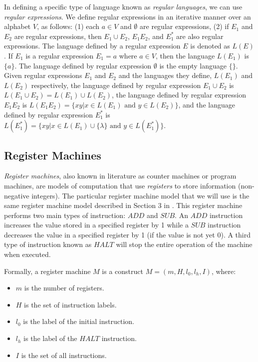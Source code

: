 \documentclass[runningheads,a4paper]{llncs}
\begin{document}
In defining a specific type of language known as \textit{regular languages}, we can use
\textit{regular expressions}. We define regular expressions in an iterative manner over an alphabet
$V$, as follows: (1) each $a \in V$ and $\emptyset$ are regular expressions, (2) if $E_1$ and $E_2$ are regular expressions, then $E_1 \cup E_2$,
$E_1 E_2$, and $E_1^*$ are also regular expressions. The language defined by a regular expression $E$ is denoted as $L(E)$. If $E_1$ is a regular
expression $E_1 = a$ where  $a \in V$, then the language $L(E_1)$ is $\{a\}$. The language defined by regular expression $\emptyset$ is the empty
language $\{\}$. Given regular expressions $E_1$ and $E_2$ and the languages they define, $L(E_1)$ and $L(E_2)$ respectively, the language
defined by regular expression $E_1 \cup E_2$ is  $L(E_1 \cup E_2) =L(E_1) \cup L(E_2)$, the language defined by regular expression $E_1 E_2$
is $L(E_1 E_2) = \{xy|x \in L(E_1) \text{ and } y \in L(E_2) \}$, and the language defined by regular expression $E_1^*$ is $L(E_1^*) = \{xy|
x \in L(E_1) \cup \{\lambda\} \text{ and } y \in L(E_1^*)\}$. 


\subsection{Register Machines}\label{sec-register}

\textit{Register machines}, also known in literature as counter machines or program machines, are models of computation that use \textit{registers} to
store information (non-negative integers). The particular register machine model that we will use is the same register machine model described in 
Section 3 in \cite{SNP}. This register machine performs two main types of instruction: $ADD$ and $SUB$. An $ADD$ instruction increases the value 
stored in a specified register by 1 while a $SUB$ instruction decreases the value in a specified register by 1 (if the value is not yet 0). A third 
type of  instruction known as $HALT$ will stop the entire operation of the machine when executed.
    
Formally, a register machine $M$ is a construct $M = (m, H, l_0, l_h, I)$, where:
  
\begin{itemize}  
   \item $m$ is the number of registers.    
   \item $H$ is the set of instruction labels.    
   \item $l_0$ is the label of the initial instruction.
   \item $l_h$ is the label of the $HALT$ instruction.
   \item $I$ is the set of all instructions.    
\end{itemize}
\end{document}
